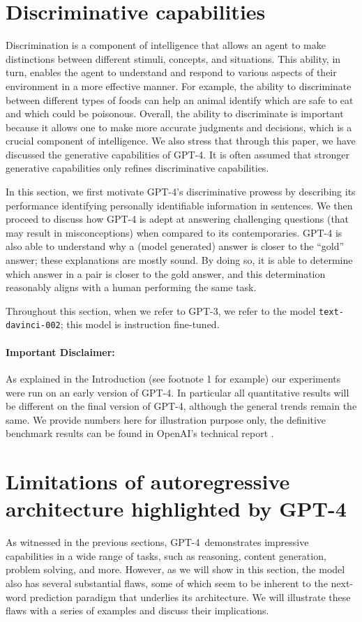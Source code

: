 \section{Discriminative capabilities}
\label{sec:discriminative}

Discrimination is a component of intelligence that allows an agent to make distinctions between different stimuli, concepts, and situations. This ability, in turn, enables the agent to understand and respond to various aspects of their environment in a more effective manner. For example, the ability to discriminate between different types of foods can help an animal identify which are safe to eat and which could be poisonous. Overall, the ability to discriminate is important because it allows one to make more accurate judgments and decisions, which is a crucial component of intelligence. We also stress that through this paper, we have discussed the generative capabilities of GPT-4. It is often assumed that stronger generative capabilities only refines discriminative capabilities.

In this section, we first motivate GPT-4's discriminative prowess by describing its performance identifying personally identifiable information in sentences. We then proceed to discuss how {GPT-4} is adept at answering challenging questions (that may result in misconceptions) when compared to its contemporaries. {GPT-4} is also able to understand why a (model generated) answer is closer to the ``gold'' answer; these explanations are mostly sound. By doing so, it is able to determine which answer in a pair is closer to the gold answer, and this determination reasonably aligns with a human performing the same task. 

Throughout this section, when we refer to GPT-3, we refer to the model \texttt{text-davinci-002}; this model is instruction fine-tuned.

\paragraph{Important Disclaimer:} As explained in the Introduction (see footnote 1 for example) our experiments were run on an early version of GPT-4. In particular all quantitative results will be different on the final version of GPT-4, although the general trends remain the same. We provide numbers here for illustration purpose only, the definitive benchmark results can be found in OpenAI's technical report \cite{gpt4}.

\section{Limitations of autoregressive architecture highlighted by GPT-4}
\label{sec:limitations}
As witnessed in the previous sections, GPT-4\ demonstrates impressive capabilities in a wide range of tasks, such as reasoning, content generation, problem solving, and more. However, as we will show in this section, the model also has several substantial flaws, some of which seem to be inherent to the next-word prediction paradigm that underlies its architecture. We will illustrate these flaws with a series of examples and discuss their implications.

